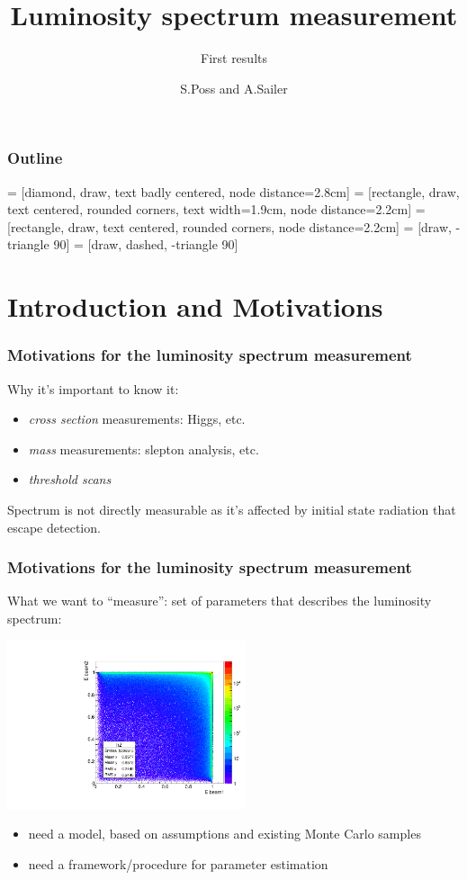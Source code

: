 \documentclass{beamer}
\author{S.Poss and A.Sailer}
\institute{CERN}
\title{Luminosity spectrum measurement}
\subtitle{First results}
\begin{document}
\begin{frame}
\titlepage
\end{frame}
\begin{frame}
\frametitle{Outline}
\tableofcontents
\end{frame}
 = [diamond, draw, text badly centered, node distance=2.8cm]
 = [rectangle, draw, text centered, rounded corners, text width=1.9cm, node distance=2.2cm]
 = [rectangle, draw, text centered, rounded corners, node distance=2.2cm]
 = [draw, -triangle 90]
 = [draw, dashed, -triangle 90]
\section{Introduction and Motivations}
\begin{frame}
\frametitle{Motivations for the luminosity spectrum measurement}
Why it's important to know it:
\begin{itemize}
\item \emph{cross section} measurements: Higgs, etc.
\item \emph{mass} measurements: slepton analysis, etc.
\item \emph{threshold scans}
\end{itemize}
Spectrum is not directly measurable as it's affected by initial state radiation
that escape detection.
\end{frame}

\begin{frame}
\frametitle{Motivations for the luminosity spectrum measurement}
What we want to ``measure'': set of parameters that describes the luminosity
spectrum:
\begin{center}
\includegraphics[width=7cm]{E1_E2_spread_strahlung.pdf}
\end{center}
\begin{itemize}
\item need a \alert{model}, based on assumptions and existing Monte
Carlo samples
\item need a framework/procedure for parameter estimation
\end{itemize}
\end{frame}
\end{document}
